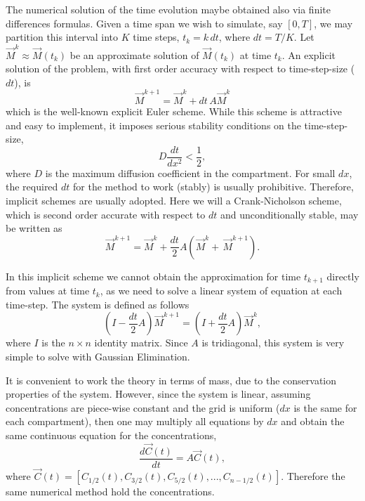 \documentclass[final,1p,times]{elsarticle}
\begin{document}
The numerical solution of the time evolution maybe obtained also via finite differences formulas. Given a time span we wish to simulate, say $[0,T]$, we may partition this interval into $K$ time steps, $t_k=k\, dt$, where $dt=T/K$. Let $\vec{M}^k\approx  \vec{M}(t_k)$ be an approximate solution of $\vec{M}(t_k)$ at time $t_k$. An explicit solution of the problem, with first order accuracy with respect to time-step-size ($dt$), is
\begin{equation}
\vec{M}^{k+1}=\vec{M}^k+dt \,A\vec{M}^k
\end{equation}
which is the well-known explicit Euler scheme. While this scheme is attractive and easy to implement, it imposes serious stability conditions on the time-step-size, 
\begin{equation}
D\frac{dt}{dx^2}<\frac{1}{2},
\end{equation} 
where $D$ is the maximum diffusion coefficient in the compartment. For small $dx$, the required $dt$ for the method to work (stably) is usually prohibitive. Therefore, implicit schemes are usually adopted. Here we will a Crank-Nicholson scheme, which is second order accurate with respect to $dt$ and unconditionally stable, may be written as
\begin{equation}
\vec{M}^{k+1}=\vec{M}^k+\frac{dt}{2}A\left(\vec{M}^k+\,\vec{M}^{k+1}\right).
\end{equation}

In this implicit scheme we cannot obtain the approximation for time $t_{k+1}$ directly from values at time $t_k$, as we need to solve a linear system of equation at each time-step. The system is defined as follows
\begin{equation}
(I-\frac{dt}{2}A)\vec{M}^{k+1}=(I+\frac{dt}{2}A)\vec{M}^{k},
\end{equation}
where $I$ is the $n\times n$ identity matrix. Since $A$ is tridiagonal, this system is very simple to solve with Gaussian Elimination.

It is convenient to work the theory in terms of mass, due to the conservation properties of the system. However, since the system is linear, assuming concentrations are piece-wise constant and the grid is uniform ($dx$ is the same for each compartment), then one may multiply all equations by $dx$ and obtain the same continuous equation for the concentrations,
\begin{equation}
\frac{d \vec{C}(t)}{dt}=A\vec{C}(t),
\end{equation}
where $\vec{C}(t)=[C_{1/2}(t), C_{3/2}(t), C_{5/2}(t), ..., C_{n-1/2}(t)]$. Therefore the same numerical method hold the concentrations.
\end{document}
